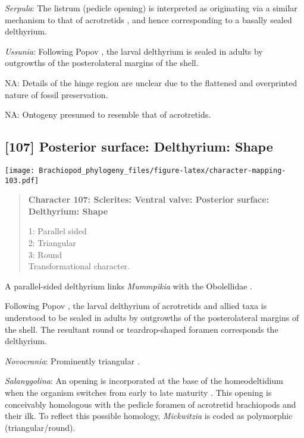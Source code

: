 \documentclass[openany]{book}
\theoremstyle{definition}
\theoremstyle{definition}
\theoremstyle{definition}
\theoremstyle{remark}
\begin{document}
\hypertarget{Serpula-coding-106}{}
\emph{Serpula}: The listrum (pedicle opening) is interpreted as
originating via a similar mechanism to that of acrotretids
\citep{Popov1992TheCambrian}, and hence corresponding to a basally
sealed delthyrium.

\hypertarget{Ussunia-coding-106}{}
\emph{Ussunia}: Following Popov \citeyearpar{Popov1992TheCambrian}, the
larval delthyrium is sealed in adults by outgrowths of the
posterolateral margins of the shell.

\hypertarget{NA-coding-106}{}
NA: Details of the hinge region are unclear due to the flattened and
overprinted nature of fossil preservation.

\hypertarget{NA-coding-106}{}
NA: Ontogeny presumed to resemble that of acrotretids.

\subsection*{{[}107{]} Posterior surface: Delthyrium:
Shape}\label{posterior-surface-delthyrium-shape}

\texttt{[image: Brachiopod\_phylogeny\_files/figure-latex/character-mapping-103.pdf]}

\begin{quote}
\textbf{Character 107: Sclerites: Ventral valve: Posterior surface:
Delthyrium: Shape}

1: Parallel sided\\
2: Triangular\\
3: Round\\
Transformational character.
\end{quote}

A parallel-sided delthyrium links \emph{Mummpikia} with the Obolellidae
\citep{Balthasar2008iMummpikia}.

Following Popov \citeyearpar{Popov1992TheCambrian}, the larval
delthyrium of acrotretids and allied taxa is understood to be sealed in
adults by outgrowths of the posterolateral margins of the shell. The
resultant round or teardrop-shaped foramen corresponds the delthyrium.

\hypertarget{Novocrania-coding-107}{}
\emph{Novocrania}: Prominently triangular \citep[see][fig.
2]{Topper2013Theoldest}.

\hypertarget{Salanygolina-coding-107}{}
\emph{Salanygolina}: An opening is incorporated at the base of the
homeodeltidium when the organism switches from early to late maturity
\citep[fig. 10 in][]{Balthasar2004Shellstructure}. This opening is
conceivably homologous with the pedicle foramen of acrotretid
brachiopods and their ilk. To reflect this possible homology,
\emph{Mickwitzia} is coded as polymorphic (triangular/round).
\end{document}
